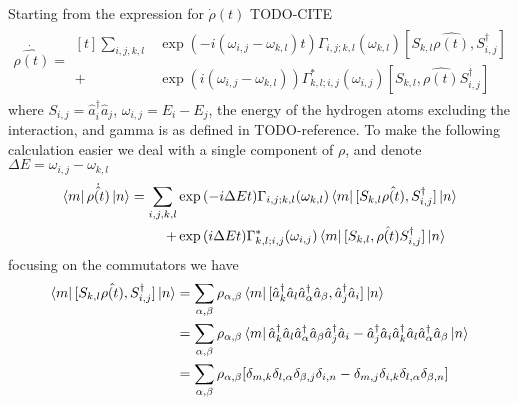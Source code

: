 Starting from the
expression for \(\dot{\rho}(t)\)
TODO-CITE
\begin{align}
    \dot{\hat{\rho{}(t)}} = \begin{aligned}[t]
        \sum_{i,j,k, l} &
        \exp{(-i(\omega_{i,j}-\omega_{k,l})t)}
        \Gamma_{i,j;k, l}(\omega_{k,l})
        [S_{k, l}\hat{\rho(t)},
        S^\dagger_{i,j}]                                       \\
        +               & \exp{(i(\omega_{i,j}-\omega_{k,l}))}
        \Gamma^*_{k, l; i,j}(\omega_{i,j})
        [S_{k, l},
            \hat{\rho(t)} S^\dagger_{i,j}]
    \end{aligned}
\end{align}
where \(S_{i,j}= \hat{a}^\dagger_i \hat{a}_j\),
\(\omega_{i,j} = E_i - E_j\), the energy of
the hydrogen atoms excluding the interaction, and
gamma is as defined in TODO-reference. To
make the following calculation easier we deal
with a single component of \(\rho \), and
denote \(\Delta{}E = \omega_{i,j}-\omega_{k,l}\)
\begin{align}
    \bra{m}\dot{\hat{\rho{}(t)}} \ket{n} = \begin{aligned}[t]
        \sum_{i,j,k, l} &
        \exp{(-i\Delta{}Et)}
        \Gamma_{i,j;k, l}(\omega_{k,l})
        \bra{m}[S_{k, l}\hat{\rho(t)},
        S^\dagger_{i,j}] \ket{n}               \\
        +               & \exp{(i\Delta{}E t)}
        \Gamma^*_{k, l; i,j}(\omega_{i,j})
        \bra{m}[S_{k, l},
            \hat{\rho(t)} S^\dagger_{i,j}]\ket{n}
    \end{aligned}
\end{align}
focusing on the commutators we have
\begin{align}
    \bra{m}[S_{k, l}\hat{\rho(t)},
    S^\dagger_{i, j}] \ket{n} & =
    \sum_{\alpha, \beta} \rho_{\alpha, \beta}\bra{m}
    [\hat{a}^\dagger_k \hat{a}_l
        \hat{a}^\dagger_\alpha \hat{a}_\beta,
        \hat{a}^\dagger_j \hat{a}_i]
    \ket{n}                       \\
                              & =
    \sum_{\alpha, \beta} \rho_{\alpha, \beta}\bra{m}
    \hat{a}^\dagger_k \hat{a}_l
    \hat{a}^\dagger_\alpha \hat{a}_\beta
    \hat{a}^\dagger_j \hat{a}_i
    -
    \hat{a}^\dagger_j \hat{a}_i
    \hat{a}^\dagger_k \hat{a}_l
    \hat{a}^\dagger_\alpha \hat{a}_\beta
    \ket{n}                       \\
                              & =
    \sum_{\alpha, \beta} \rho_{\alpha, \beta} [
        \delta_{m, k}\delta_{l, \alpha}
        \delta_{\beta, j}\delta_{i, n}
        -\delta_{m, j}\delta_{i, k}
        \delta_{l, \alpha}\delta_{\beta, n}]
\end{align}

